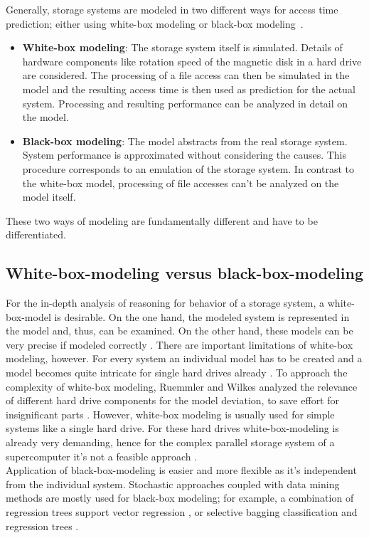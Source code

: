 \documentclass{superfri}
\begin{document}
Generally, storage systems are modeled in two different ways for access time prediction; either using white-box modeling or black-box modeling~\cite{Crume:2013:FML:2538542.2538561}.
\begin{itemize}
	\item \textbf{White-box modeling}: The storage system itself is simulated. 
	Details of hardware components like rotation speed of the magnetic disk in a hard drive are considered. 
	The processing of a file access can then be simulated in the model and the resulting access time is then used as prediction for the actual system.
	Processing and resulting performance can be analyzed in detail on the model.
	\item \textbf{Black-box modeling}: The model abstracts from the real storage system. 
	System performance is approximated without considering the causes. %
	This procedure corresponds to an emulation of the storage system.
	In contrast to the white-box model, processing of file accesses can't be analyzed on the model itself.
\end{itemize}
These two ways of modeling are fundamentally different and have to be differentiated.

\subsection{White-box-modeling versus black-box-modeling}
For the in-depth analysis of reasoning for behavior of a storage system, a white-box-model is desirable.
On the one hand, the modeled system is represented in the model and, thus, can be examined. 
On the other hand, these models can be very precise if modeled correctly \cite{Ruemmler94anintroduction}.
There are important limitations of white-box modeling, however. 
For every system an individual model has to be created and a model becomes quite intricate for single hard drives already \cite{Crume:2013:FML:2538542.2538561}.
To approach the complexity of white-box modeling, Ruemmler and Wilkes analyzed the relevance of different hard drive components for the model deviation, to save effort for insignificant parts \cite{Ruemmler94anintroduction}.
However, white-box modeling is usually used for simple systems like a single hard drive. For these hard drives white-box-modeling is already very demanding, hence for the complex parallel storage system of a supercomputer it's not a feasible approach \cite{DBLP:conf/npc/ZhangLZJC10}.\\

Application of black-box-modeling is easier and more flexible as it's independent from the individual system.
Stochastic approaches coupled with data mining methods are mostly used for black-box modeling; for example, a combination of regression trees support vector regression \cite{Dai:2012:SDP:2477169.2477214}, or selective bagging classification and regression trees \cite{DBLP:conf/npc/ZhangLZJC10}.
\end{document}
